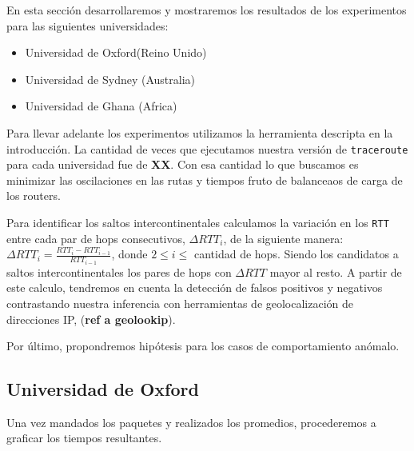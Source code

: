 En esta sección desarrollaremos y mostraremos los resultados de los experimentos para las siguientes
universidades:

\begin{itemize}
\item Universidad de Oxford(Reino Unido)
\item Universidad de Sydney (Australia)
\item Universidad de Ghana (Africa)
\end{itemize}

Para llevar adelante los experimentos utilizamos la herramienta descripta en la introducción. La cantidad de veces que ejecutamos nuestra versión de \texttt{traceroute} para cada universidad fue de \textbf{XX}. Con esa cantidad lo que buscamos  es minimizar las oscilaciones en las rutas y tiempos fruto de balanceaos de carga de los routers.

Para identificar los saltos intercontinentales calculamos la variación en los \texttt{RTT} entre cada par de hops consecutivos, $\Delta RTT_{i}$, de la siguiente manera: \(\Delta RTT_{i} = \frac{RTT_{i} - RTT_{i-1}}{RTT_{i-1}}\), donde $2 \leq i \leq$ cantidad de hops. Siendo los candidatos a saltos intercontinentales los pares de hops con $\Delta RTT$ mayor al resto. A partir de este calculo, tendremos en cuenta la detección de falsos positivos y negativos contrastando nuestra inferencia con herramientas de geolocalización de direcciones IP, (\textbf{ref a geolookip}).

Por último, propondremos hipótesis para los casos de comportamiento anómalo.

\subsection{Universidad de Oxford}

Una vez mandados los paquetes y realizados los promedios, procederemos a graficar los tiempos resultantes.


